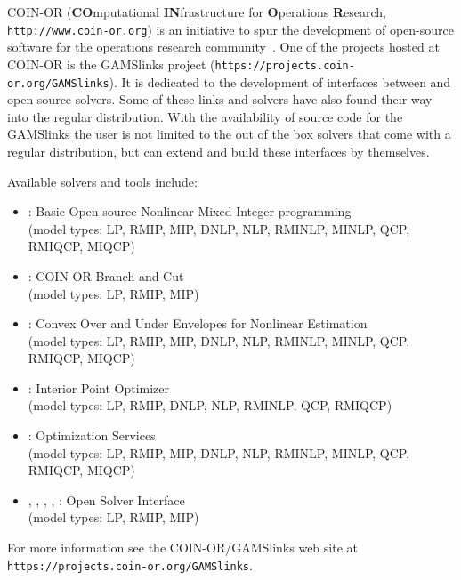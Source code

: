 COIN-OR (\textbf{CO}mputational \textbf{IN}frastructure for \textbf{O}perations \textbf{R}esearch, \texttt{http://www.coin-or.org}) is an initiative to spur the development of open-source software for the operations research community~\cite{Lo03}.
One of the projects hosted at COIN-OR is the GAMSlinks project (\texttt{https://projects.coin-or.org/GAMSlinks}).
It is dedicated to the development of interfaces between \MYGAMS and open source solvers.
Some of these links and solvers have also found their way into the regular \MYGAMS distribution.
With the availability of source code for the GAMSlinks the user is not limited to the out of the box solvers that come with a regular \MYGAMS distribution, but can extend and build these interfaces by themselves.

Available solvers and tools include:
\begin{itemize}
\item \BONMIN: Basic Open-source Nonlinear Mixed Integer programming\\
(model types: LP, RMIP, MIP, DNLP, NLP, RMINLP, MINLP, QCP, RMIQCP, MIQCP)
\item \CBC: COIN-OR Branch and Cut\\
(model types: LP, RMIP, MIP)
\item \COUENNE: Convex Over and Under Envelopes for Nonlinear Estimation\\
(model types: LP, RMIP, MIP, DNLP, NLP, RMINLP, MINLP, QCP, RMIQCP, MIQCP)
\item \IPOPT: Interior Point Optimizer\\
(model types: LP, RMIP, DNLP, NLP, RMINLP, QCP, RMIQCP)
\item \OS: Optimization Services\\
(model types: LP, RMIP, MIP, DNLP, NLP, RMINLP, MINLP, QCP, RMIQCP, MIQCP)
\item \OSICPLEX, \OSIGLPK, \OSIGUROBI, \OSIMOSEK, \OSIXPRESS: Open Solver Interface\\
(model types: LP, RMIP, MIP)
\end{itemize}

For more information see the COIN-OR/GAMSlinks web site at
\texttt{https://projects.coin-or.org/GAMSlinks}.


